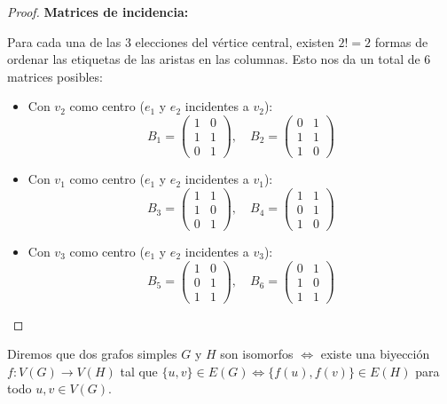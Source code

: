 \begin{proof}
    \textbf{Matrices de incidencia:} \par
    Para cada una de las 3 elecciones del vértice central, existen \( 2! = 2 \) formas de ordenar las etiquetas de las aristas en las columnas. Esto nos da un total de 6 matrices posibles:
    \begin{itemize}
        \item Con \( v_2 \) como centro (\( e_1 \) y \( e_2 \) incidentes a \( v_2 \)):
              \[ B_1 = \begin{pmatrix} 1 & 0 \\ 1 & 1 \\ 0 & 1 \end{pmatrix}, \quad B_2 = \begin{pmatrix} 0 & 1 \\ 1 & 1 \\ 1 & 0 \end{pmatrix} \]
        \item Con \( v_1 \) como centro (\( e_1 \) y \( e_2 \) incidentes a \( v_1 \)):
              \[ B_3 = \begin{pmatrix} 1 & 1 \\ 1 & 0 \\ 0 & 1 \end{pmatrix}, \quad B_4 = \begin{pmatrix} 1 & 1 \\ 0 & 1 \\ 1 & 0 \end{pmatrix} \]
        \item Con \( v_3 \) como centro (\( e_1 \) y \( e_2 \) incidentes a \( v_3 \)):
              \[ B_5 = \begin{pmatrix} 1 & 0 \\ 0 & 1 \\ 1 & 1 \end{pmatrix}, \quad B_6 = \begin{pmatrix} 0 & 1 \\ 1 & 0 \\ 1 & 1 \end{pmatrix} \]
    \end{itemize}
\end{proof}

\begin{definition}\label{def:isomorfos}
    Diremos que dos grafos simples \( G \) y \( H \) son isomorfos \( \iff \) existe una biyección \( f : V(G) \to V(H) \) tal que \( \{u,v\} \in E(G) \iff \{f(u), f(v)\} \in E(H)\) para todo \( u,v \in V(G) \).
\end{definition}

